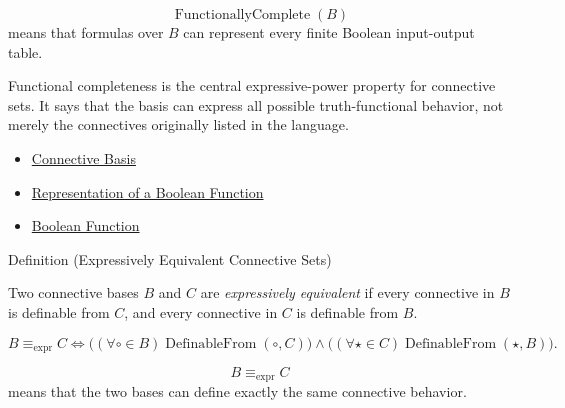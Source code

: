 \begin{remark*}
\[
  \operatorname{FunctionallyComplete}(B)
\] means that formulas over \(B\) can
represent every finite Boolean input-output table.
\end{remark*}

\begin{remark*}[Interpretation]
Functional completeness is the central expressive-power property for connective
sets. It says that the basis can express all possible truth-functional behavior,
not merely the connectives originally listed in the language.
\end{remark*}

\begin{dependencies}
\begin{itemize}
  \item \hyperref[def:connective-basis-propositional-logic]{Connective Basis}
  \item \hyperref[def:boolean-function-representation-propositional-logic]{Representation of a Boolean Function}
  \item \hyperref[def:boolean-function-propositional-logic]{Boolean Function}
\end{itemize}
\end{dependencies}

\begin{definitionbox}{Definition (Expressively Equivalent Connective Sets)}
\begin{definition}
\label{def:expressively-equivalent-connective-sets-propositional-logic}
Two connective bases \(B\) and \(C\) are \emph{expressively equivalent} if every
connective in \(B\) is definable from \(C\), and every connective in \(C\) is
definable from \(B\).
\end{definition}
\end{definitionbox}

\begin{remark*}
\[
B\equiv_{\mathrm{expr}} C
\Longleftrightarrow
\bigl((\forall\circ\in B)\operatorname{DefinableFrom}(\circ,C)\bigr)
\land
\bigl((\forall\star\in C)\operatorname{DefinableFrom}(\star,B)\bigr).
\]
\end{remark*}

\begin{remark*}
\[
  B\equiv_{\mathrm{expr}} C
\] means that the two bases can define exactly the
same connective behavior.
\end{remark*}

